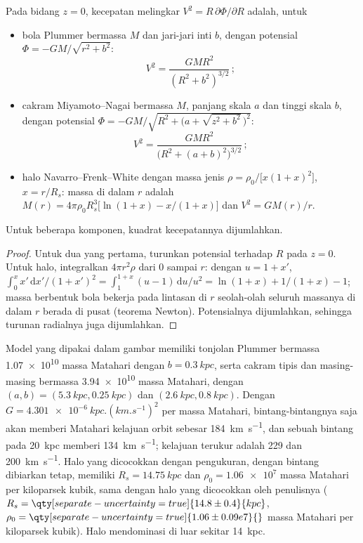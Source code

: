 \begin{proposition}\label{prop:b3:milky-way-galaxies:models}
Pada bidang $z = 0$, kecepatan melingkar $V^2 = R\,\partial\Phi/\partial R$
adalah, untuk
\begin{itemize}
\item bola Plummer bermassa $M$ dan jari-jari inti $b$, dengan potensial
  $\Phi = -GM/\sqrt{r^2 + b^2}$:
  \[ V^2 = \frac{GMR^2}{(R^2 + b^2)^{3/2}}\,; \]
\item cakram Miyamoto--Nagai bermassa $M$, panjang skala $a$ dan tinggi skala
  $b$, dengan potensial
  $\Phi = -GM\big/\sqrt{R^2 + \bigl(a + \sqrt{z^2 + b^2}\,\bigr)^2}$:
  \[ V^2 = \frac{GMR^2}{\bigl(R^2 + (a + b)^2\bigr)^{3/2}}\,; \]
\item halo Navarro--Frenk--White dengan massa jenis
  $\rho = \rho_0\big/\bigl[x(1 + x)^2\bigr]$, $x = r/R_s$: massa di dalam $r$
  adalah $M(r) = 4\pi\rho_0R_s^3\bigl[\ln(1 + x) - x/(1 + x)\bigr]$ dan
  $V^2 = GM(r)/r$.
\end{itemize}
Untuk beberapa komponen, kuadrat kecepatannya dijumlahkan.
\end{proposition}

\begin{proof}
Untuk dua yang pertama, turunkan potensial terhadap $R$ pada
$z = 0$. Untuk halo, integralkan $4\pi r^2\rho$ dari 0 sampai $r$: dengan
$u = 1 + x'$, $\int_0^x x'\,\mathrm{d}x'/(1 + x')^2 =
\int_1^{1+x}(u - 1)\,\mathrm{d}u/u^2 = \ln(1 + x) + 1/(1 + x) - 1$; massa
berbentuk bola bekerja pada lintasan di $r$ seolah-olah seluruh massanya di dalam $r$
berada di pusat (teorema Newton). Potensialnya dijumlahkan, sehingga
turunan radialnya juga dijumlahkan.
\end{proof}

Model yang dipakai dalam gambar memiliki tonjolan Plummer bermassa
\num{1.07e10} massa Matahari dengan $b = \qty{0.3}{kpc}$, serta cakram tipis dan
 masing-masing bermassa \num{3.94e10} massa Matahari, dengan $(a, b) =
(\qty{5.3}{kpc}, \qty{0.25}{kpc})$ dan $(\qty{2.6}{kpc}, \qty{0.8}{kpc})$.
Dengan $G = \qty{4.301e-6}{kpc.(km.s^{-1})^2}$ per massa Matahari, bintang-bintangnya
saja akan memberi Matahari kelajuan orbit sebesar \qty{184}{km.s^{-1}}, dan sebuah
bintang pada \qty{20}{kpc} memberi \qty{134}{km.s^{-1}}; kelajuan terukur adalah
229 dan \qty{200}{km.s^{-1}}. Halo yang dicocokkan dengan pengukuran, dengan
bintang dibiarkan tetap, memiliki $R_s = \qty{14.75}{kpc}$ dan
$\rho_0 = \num{1.06e7}$ massa Matahari per kiloparsek kubik, sama dengan
halo yang dicocokkan oleh penulisnya ($R_s = \qty[separate-uncertainty=true]{14.8 \pm 0.4}{kpc}$,
$\rho_0 = \qty[separate-uncertainty=true]{1.06 \pm 0.09 e7}{}$ massa Matahari
per kiloparsek kubik). Halo mendominasi di luar sekitar \qty{14}{kpc}.

